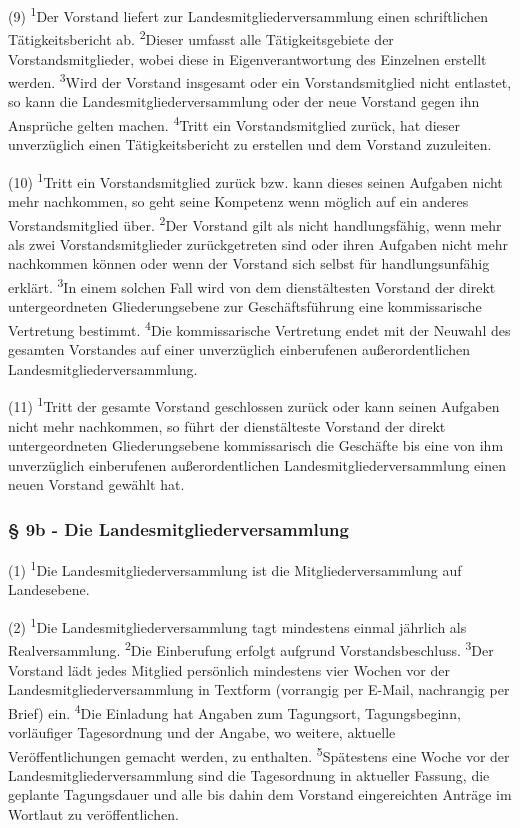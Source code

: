 (9) \textsuperscript{1}Der Vorstand liefert zur
Landesmitgliederversammlung einen schriftlichen Tätigkeitsbericht ab.
\textsuperscript{2}Dieser umfasst alle Tätigkeitsgebiete der
Vorstandsmitglieder, wobei diese in Eigenverantwortung des Einzelnen
erstellt werden. \textsuperscript{3}Wird der Vorstand insgesamt oder ein
Vorstandsmitglied nicht entlastet, so kann die
Landesmitgliederversammlung oder der neue Vorstand gegen ihn Ansprüche
gelten machen. \textsuperscript{4}Tritt ein Vorstandsmitglied zurück,
hat dieser unverzüglich einen Tätigkeitsbericht zu erstellen und dem
Vorstand zuzuleiten.

(10) \textsuperscript{1}Tritt ein Vorstandsmitglied zurück bzw. kann
dieses seinen Aufgaben nicht mehr nachkommen, so geht seine Kompetenz
wenn möglich auf ein anderes Vorstandsmitglied über.
\textsuperscript{2}Der Vorstand gilt als nicht handlungsfähig, wenn mehr
als zwei Vorstandsmitglieder zurückgetreten sind oder ihren Aufgaben
nicht mehr nachkommen können oder wenn der Vorstand sich selbst für
handlungsunfähig erklärt. \textsuperscript{3}In einem solchen Fall wird
von dem dienstältesten Vorstand der direkt untergeordneten
Gliederungsebene zur Geschäftsführung eine kommissarische Vertretung
bestimmt. \textsuperscript{4}Die kommissarische Vertretung endet mit der
Neuwahl des gesamten Vorstandes auf einer unverzüglich einberufenen
außerordentlichen Landesmitgliederversammlung.

(11) \textsuperscript{1}Tritt der gesamte Vorstand geschlossen zurück
oder kann seinen Aufgaben nicht mehr nachkommen, so führt der
dienstälteste Vorstand der direkt untergeordneten Gliederungsebene
kommissarisch die Geschäfte bis eine von ihm unverzüglich einberufenen
außerordentlichen Landesmitgliederversammlung einen neuen Vorstand
gewählt hat.

\subsubsection{§ 9b - Die Landesmitgliederversammlung}

(1) \textsuperscript{1}Die Landesmitgliederversammlung ist die
Mitgliederversammlung auf Landesebene.

(2) \textsuperscript{1}Die Landesmitgliederversammlung tagt mindestens
einmal jährlich als Realversammlung. \textsuperscript{2}Die Einberufung
erfolgt aufgrund Vorstandsbeschluss. \textsuperscript{3}Der Vorstand
lädt jedes Mitglied persönlich mindestens vier Wochen vor der
Landesmitgliederversammlung in Textform (vorrangig per E-Mail,
nachrangig per Brief) ein. \textsuperscript{4}Die Einladung hat Angaben
zum Tagungsort, Tagungsbeginn, vorläufiger Tagesordnung und der Angabe,
wo weitere, aktuelle Veröffentlichungen gemacht werden, zu enthalten.
\textsuperscript{5}Spätestens eine Woche vor der
Landesmitgliederversammlung sind die Tagesordnung in aktueller Fassung,
die geplante Tagungsdauer und alle bis dahin dem Vorstand eingereichten
Anträge im Wortlaut zu veröffentlichen.

